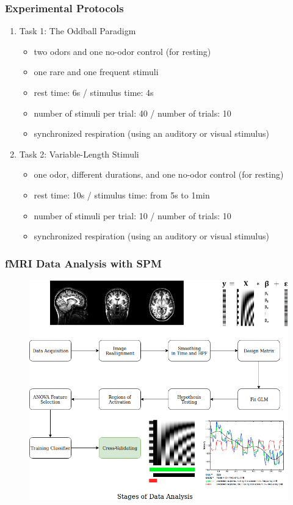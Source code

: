 \documentclass{beamer}
\begin{document}
\begin{frame}
\frametitle{Experimental Protocols}
\begin{enumerate}
	\item
	Task 1: The Oddball Paradigm
	\begin{itemize}
		\item
		two odors and one no-odor control (for resting)
		\item
		one rare and one frequent stimuli
		\item
		rest time: 6s / stimulus time: 4s
		\item
		number of stimuli per trial: 40 / number of trials: 10
		\item
		synchronized respiration (using an auditory or visual stimulus)
	\end{itemize}
	\item
	Task 2: Variable-Length Stimuli
	\begin{itemize}
		\item
		one odor, different durations, and one no-odor control (for resting)
		\item
		rest time: 10s / stimulus time: from 5s to 1min
		\item
		number of stimuli per trial: 10 / number of trials: 10
		\item
		synchronized respiration (using an auditory or visual stimulus)
	\end{itemize}
	
\end{enumerate}
\end{frame}



\begin{frame}
\frametitle{fMRI Data Analysis with SPM}
\begin{figure}
	\includegraphics[scale=0.3]{img2.png}
\end{figure}

\end{frame}
\end{document}
